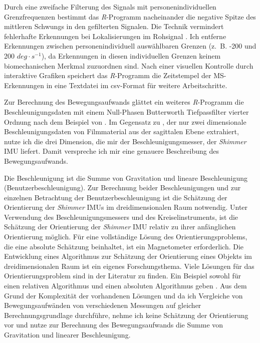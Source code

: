 Durch eine zweifache Filterung des Signals mit personenindividuellen Grenzfrequenzen bestimmt das \emph{R}-Programm nacheinander die negative Spitze des mittleren Schwungs in den gefilterten Signalen. Die Technik vermindert fehlerhafte Erkennungen bei Lokalisierungen im Rohsignal \citep[vgl.][]{Lee2011}. Ich entferne Erkennungen zwischen personenindividuell auswählbaren Grenzen (z.~B. -200 und 200 $deg \cdot s^{-1}$), da Erkennungen in diesen individuellen Grenzen keinem biomechanischen Merkmal zuzuordnen sind. Nach einer visuellen Kontrolle durch interaktive Grafiken speichert das \emph{R}-Programm die Zeitstempel der \ac{MS}-Erkennungen in eine Textdatei im \acs{csv}-Format für weitere Arbeitschritte.

Zur Berechnung des Bewegungsaufwands glättet ein weiteres \emph{R}-Programm die Beschleunigungsdaten mit einem Null-Phasen Butterworth Tiefpassfilter vierter Ordnung nach dem Beispiel von \citet{Hreljac2000}. Im Gegensatz zu \citet{Hreljac2000}, der nur zwei dimensionale Beschleunigungsdaten von Filmmaterial aus der sagittalen Ebene extrahiert, nutze ich die drei Dimension, die mir der Beschleunigungsmesser, der \emph{Shimmer} \ac{IMU} liefert. Damit verspreche ich mir eine genauere Beschreibung des Bewegungsaufwands.

Die Beschleunigung ist die Summe von Gravitation und lineare Beschleunigung (Benutzerbeschleunigung). Zur Berechnung beider Beschleunigungen und zur einzelnen Betrachtung der Benutzerbeschleunigung ist die Schätzung der Orientierung der \emph{Shimmer} \acp{IMU} im dreidimensionalen Raum notwendig. Unter Verwendung des Beschleunigungsmessers und des Kreiselinstruments, ist die Schätzung der Orientierung der \emph{Shimmer} \ac{IMU} relativ zu ihrer anfänglichen Orientierung möglich. Für eine vollständige Lösung des Orientierungsproblems, die eine absolute Schätzung beinhaltet, ist ein Magnetometer erforderlich. Die Entwicklung eines Algorithmus zur Schätzung der Orientierung eines Objekts im dreidimensionalen Raum ist ein eigenes Forschungsthema. Viele Lösungen für das Orientierungsproblem sind in der Literatur zu finden. Ein Beispiel sowohl für einen relativen Algorithmus und einen absoluten Algorithmus geben \citet{Madgwick2011}. Aus dem Grund der Komplexität der vorhandenen Lösungen und da ich Vergleiche von Bewegungsaufwänden von verschiedenen Messungen auf gleicher Berechnungsgrundlage durchführe, nehme ich keine Schätzung der Orientierung vor und nutze zur Berechnung des Bewegungsaufwands die Summe von Gravitation und linearer Beschleunigung.

